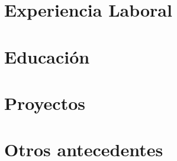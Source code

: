 \documentclass[letter,10pt]{article}
\begin{document}


\section{Experiencia Laboral}


\section{Educación}


\section{Proyectos}


\section{Otros antecedentes}

\end{document}
